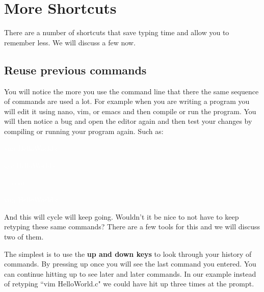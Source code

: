 \documentclass[oneside]{book}
\newcommand{\commandline}[1]{\begin{center} \colorbox{Dark}{\textcolor{white}{#1}} \end{center}}
\begin{document}
    

\newpage
\section{More Shortcuts}
There are a number of shortcuts that save typing time and allow you to remember less. We will discuss a few now.
\subsection{Reuse previous commands}
You will notice the more you use the command line that there the same sequence of commands are used a lot. For example when you are writing a program you will edit it using nano, vim, or emacs and then compile or run the program. You will then notice a bug and open the editor again and then test your changes by compiling or running your program again. Such as:
\commandline{vim HelloWorld.c}
\commandline{gcc HelloWorld.c}
\commandline{./a.out}
\commandline{vim HelloWorld.c}
And this will cycle will keep going. Wouldn't it be nice to not have to keep retyping these same commands? There are a few tools for this and we will discuss two of them. 

The simplest is to use the \textbf{up and down keys} to look through your history of commands. By pressing up once you will see the last command you entered. You can continue hitting up to see later and later commands. In our example instead of retyping ``vim HelloWorld.c" we could have hit up three times at the prompt. 
\end{document}
